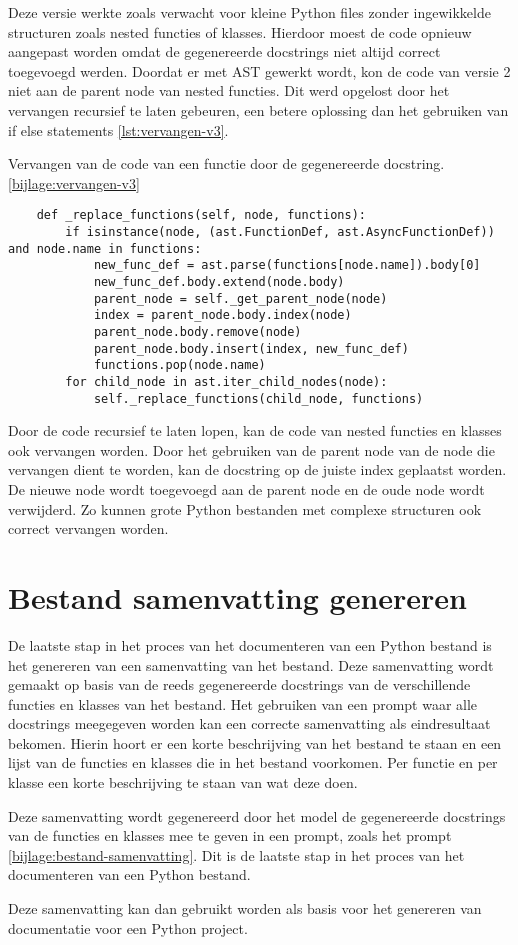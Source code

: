 Deze versie werkte zoals verwacht voor kleine Python files zonder ingewikkelde structuren zoals nested functies of klasses.
Hierdoor moest de code opnieuw aangepast worden omdat de gegenereerde docstrings niet altijd correct toegevoegd werden.
Doordat er met AST gewerkt wordt, kon de code van versie 2 niet aan de parent node van nested functies.
Dit werd opgelost door het vervangen recursief te laten gebeuren, een betere oplossing dan het gebruiken van if else statements \ref{lst:vervangen-v3}.

\begin{listing}
    \caption{Vervangen van de code van een functie door de gegenereerde docstring. \ref{bijlage:vervangen-v3}}
    \label{lst:vervangen-v3}
    \begin{verbatim}
    def _replace_functions(self, node, functions):
        if isinstance(node, (ast.FunctionDef, ast.AsyncFunctionDef)) and node.name in functions:
            new_func_def = ast.parse(functions[node.name]).body[0]
            new_func_def.body.extend(node.body)
            parent_node = self._get_parent_node(node)
            index = parent_node.body.index(node)
            parent_node.body.remove(node)
            parent_node.body.insert(index, new_func_def)
            functions.pop(node.name)
        for child_node in ast.iter_child_nodes(node):
            self._replace_functions(child_node, functions)
    \end{verbatim}
\end{listing}

Door de code recursief te laten lopen, kan de code van nested functies en klasses ook vervangen worden.
Door het gebruiken van de parent node van de node die vervangen dient te worden, kan de docstring op de juiste index geplaatst worden.
De nieuwe node wordt toegevoegd aan de parent node en de oude node wordt verwijderd.
Zo kunnen grote Python bestanden met complexe structuren ook correct vervangen worden.

\section{Bestand samenvatting genereren}
\label{sec:bestanddocumentatie-samenvatting}
De laatste stap in het proces van het documenteren van een Python bestand is het genereren van een samenvatting van het bestand.
Deze samenvatting wordt gemaakt op basis van de reeds gegenereerde docstrings van de verschillende functies en klasses van het bestand.
Het gebruiken van een prompt waar alle docstrings meegegeven worden kan een correcte samenvatting als eindresultaat bekomen.
Hierin hoort er een korte beschrijving van het bestand te staan en een lijst van de functies en klasses die in het bestand voorkomen.
Per functie en per klasse een korte beschrijving te staan van wat deze doen.

Deze samenvatting wordt gegenereerd door het model de gegenereerde docstrings van de functies en klasses mee te geven in een prompt, zoals het prompt \ref{bijlage:bestand-samenvatting}.
Dit is de laatste stap in het proces van het documenteren van een Python bestand.

Deze samenvatting kan dan gebruikt worden als basis voor het genereren van documentatie voor een Python project.